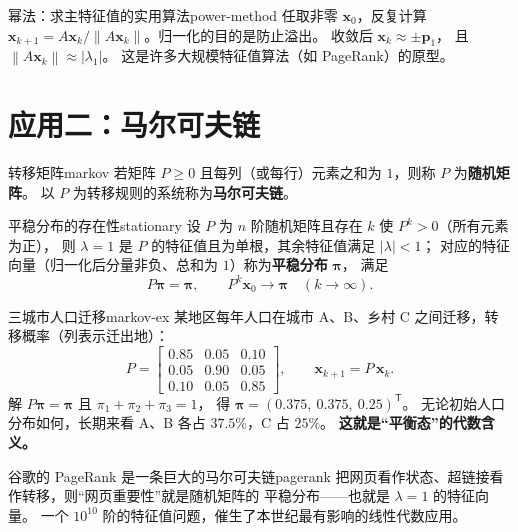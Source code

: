 \documentclass[11pt,a4paper,openany]{ctexbook}
\newcommand{\norm}[1]{\left\lVert #1 \right\rVert}
\begin{document}
\begin{keypoint}{幂法：求主特征值的实用算法}{power-method}
任取非零 $\boldsymbol{x}_0$，反复计算 $\boldsymbol{x}_{k+1}=A\boldsymbol{x}_k
/\norm{A\boldsymbol{x}_k}$。归一化的目的是防止溢出。
收敛后 $\boldsymbol{x}_k\approx\pm\boldsymbol{p}_1$，
且 $\norm{A\boldsymbol{x}_k}\approx|\lambda_1|$。
这是许多大规模特征值算法（如 PageRank）的原型。
\end{keypoint}

\section{应用二：马尔可夫链}

\begin{defn}{转移矩阵}{markov}
若矩阵 $P\ge 0$ 且每列（或每行）元素之和为 $1$，则称 $P$ 为\textbf{随机矩阵}。
以 $P$ 为转移规则的系统称为\textbf{马尔可夫链}。
\end{defn}

\begin{thm}{平稳分布的存在性}{stationary}
设 $P$ 为 $n$ 阶随机矩阵且存在 $k$ 使 $P^k>0$（所有元素为正），
则 $\lambda=1$ 是 $P$ 的特征值且为单根，其余特征值满足 $|\lambda|<1$；
对应的特征向量（归一化后分量非负、总和为 $1$）称为\textbf{平稳分布} $\boldsymbol{\pi}$，
满足
\[
P\boldsymbol{\pi}=\boldsymbol{\pi},
\qquad
P^k\boldsymbol{x}_0\to\boldsymbol{\pi}\quad(k\to\infty).
\]
\end{thm}

\begin{exmp}{三城市人口迁移}{markov-ex}
某地区每年人口在城市 A、B、乡村 C 之间迁移，转移概率（列表示迁出地）：
\[
P=\begin{bmatrix}
0.85 & 0.05 & 0.10\\
0.05 & 0.90 & 0.05\\
0.10 & 0.05 & 0.85
\end{bmatrix},
\qquad \boldsymbol{x}_{k+1}=P\,\boldsymbol{x}_k.
\]
解 $P\boldsymbol{\pi}=\boldsymbol{\pi}$ 且 $\pi_1+\pi_2+\pi_3=1$，
得 $\boldsymbol{\pi}=(0.375,\ 0.375,\ 0.25)^{\mathsf T}$。
无论初始人口分布如何，长期来看 A、B 各占 $37.5\%$，C 占 $25\%$。
\textbf{这就是“平衡态”的代数含义。}
\end{exmp}

\begin{remk}{谷歌的 PageRank 是一条巨大的马尔可夫链}{pagerank}
把网页看作状态、超链接看作转移，则“网页重要性”就是随机矩阵的
平稳分布——也就是 $\lambda=1$ 的特征向量。
一个 $10^{10}$ 阶的特征值问题，催生了本世纪最有影响的线性代数应用。
\end{remk}
\end{document}
